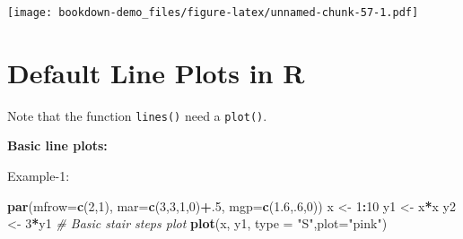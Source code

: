 \documentclass[]{book}
\newenvironment{Shaded}{\begin{snugshade}}{\end{snugshade}}
\newcommand{\KeywordTok}[1]{\textcolor[rgb]{0.13,0.29,0.53}{\textbf{#1}}}
\newcommand{\DataTypeTok}[1]{\textcolor[rgb]{0.13,0.29,0.53}{#1}}
\newcommand{\DecValTok}[1]{\textcolor[rgb]{0.00,0.00,0.81}{#1}}
\newcommand{\FloatTok}[1]{\textcolor[rgb]{0.00,0.00,0.81}{#1}}
\newcommand{\StringTok}[1]{\textcolor[rgb]{0.31,0.60,0.02}{#1}}
\newcommand{\CommentTok}[1]{\textcolor[rgb]{0.56,0.35,0.01}{\textit{#1}}}
\newcommand{\OperatorTok}[1]{\textcolor[rgb]{0.81,0.36,0.00}{\textbf{#1}}}
\newcommand{\NormalTok}[1]{#1}
\begin{document}
\begin{Shaded}
\end{Shaded}

\texttt{[image: bookdown-demo\_files/figure-latex/unnamed-chunk-57-1.pdf]}

\chapter{Default Line Plots in R}\label{default-line-plots-in-r}

Note that the function \texttt{lines()} need a \texttt{plot()}.

\textbf{Basic line plots:}

Example-1:

\begin{Shaded}
\begin{Highlighting}[]
\KeywordTok{par}\NormalTok{(}\DataTypeTok{mfrow=}\KeywordTok{c}\NormalTok{(}\DecValTok{2}\NormalTok{,}\DecValTok{1}\NormalTok{), }\DataTypeTok{mar=}\KeywordTok{c}\NormalTok{(}\DecValTok{3}\NormalTok{,}\DecValTok{3}\NormalTok{,}\DecValTok{1}\NormalTok{,}\DecValTok{0}\NormalTok{)}\OperatorTok{+}\NormalTok{.}\DecValTok{5}\NormalTok{, }\DataTypeTok{mgp=}\KeywordTok{c}\NormalTok{(}\FloatTok{1.6}\NormalTok{,.}\DecValTok{6}\NormalTok{,}\DecValTok{0}\NormalTok{))}
\NormalTok{x <-}\StringTok{ }\DecValTok{1}\OperatorTok{:}\DecValTok{10}
\NormalTok{y1 <-}\StringTok{ }\NormalTok{x}\OperatorTok{*}\NormalTok{x}
\NormalTok{y2  <-}\StringTok{ }\DecValTok{3}\OperatorTok{*}\NormalTok{y1}
\CommentTok{# Basic stair steps plot }
\KeywordTok{plot}\NormalTok{(x, y1, }\DataTypeTok{type =} \StringTok{"S"}\NormalTok{,}\DataTypeTok{plot=}\StringTok{"pink"}\NormalTok{)}
\end{Highlighting}
\end{Shaded}
\end{document}
